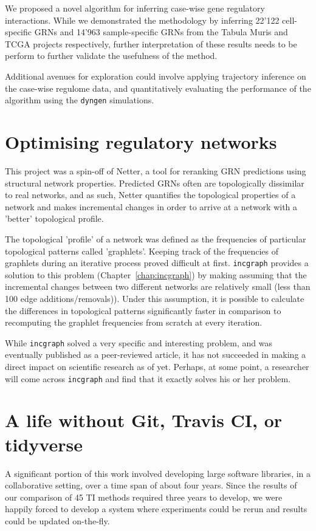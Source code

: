 We proposed a novel algorithm for inferring case-wise gene regulatory interactions. While we demonstrated the methodology by inferring 22'122 cell-specific GRNs and 14'963 sample-specific GRNs from the Tabula Muris and TCGA projects respectively, further interpretation of these results needs to be perform to further validate the usefulness of the method.

Additional avenues for exploration could involve applying trajectory inference on the case-wise regulome data, and quantitatively evaluating the performance of the algorithm using the \texttt{dyngen} simulations.

\section{Optimising regulatory networks}
This project was a spin-off of Netter\cite{ruyssinck_netterrerankinggene_2016}, a tool for reranking GRN predictions using structural network properties. 
Predicted GRNs often are topologically dissimilar to real networks, and as such, Netter quantifies the topological properties of a network and makes incremental changes in order to arrive at a network with a 'better' topological profile.

The topological 'profile' of a network was defined as the frequencies of particular topological patterns called 'graphlets'. Keeping track of the frequencies of graphlets during an iterative process proved difficult at first. 
\texttt{incgraph} provides a solution to this problem (Chapter~\ref{chap:incgraph}) by making assuming that the incremental changes between two different networks are relatively small (less than 100 edge additions/removals)). Under this assumption, it is possible to calculate the differences in topological patterns significantly faster in comparison to recomputing the graphlet frequencies from scratch at every iteration.

While \texttt{incgraph} solved a very specific and interesting problem, and was eventually published as a peer-reviewed article, it has not succeeded in making a direct impact on scientific research as of yet. Perhaps, at some point, a researcher will come across \texttt{incgraph} and find that it exactly solves his or her problem.



\section{A life without Git, Travis CI, or tidyverse}
A significant portion of this work involved developing large software libraries, in a collaborative setting, over a time span of about four years. Since the results of our comparison of 45 TI methods required three years to develop, we were happily forced to develop a system where experiments could be rerun and results could be updated on-the-fly.

